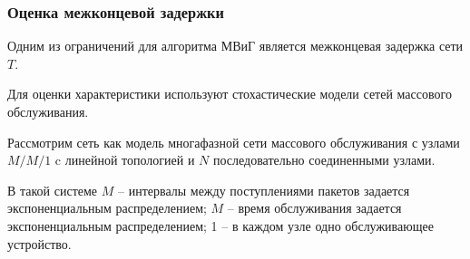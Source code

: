 \begin{frame}
    \justifying
    \frametitle{Оценка межконцевой задержки}
    \fontsize{8pt}{7.2}\selectfont

    Одним из ограничений для алгоритма МВиГ является межконцевая задержка сети $T$.
    \bigskip

    Для оценки характеристики используют стохастические модели сетей массового обслуживания.

    \bigskip

    {Рассмотрим сеть как модель многафазной сети массового обслуживания  с узлами $M/M/1$ c линейной топологией и $N$ последовательно соединенными узлами. 

    \bigskip

    В такой системе $M$ -- интервалы между поступлениями пакетов задается экспоненциальным распределением; $M$ --  время обслуживания задается экспоненциальным распределением; 1 -- в каждом узле одно обслуживающее устройство.}

   
\end{frame}

